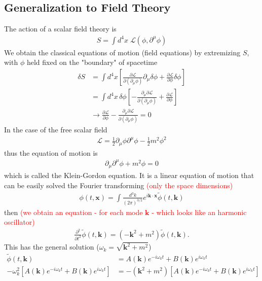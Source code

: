 \documentclass{article}
\begin{document}
\subsection{Generalization to Field Theory}
The action of a scalar field theory is
\begin{align}
S=\int d^4x\;\mathcal{L}(\phi,\partial^\mu\phi)
\end{align}
We obtain the classical equations of motion (field equations) by extremizing $S$, with $\phi$ held fixed on the "boundary" of spacetime
\begin{align}
\delta S
&=\int d^4x\left[\frac{\partial\mathcal{L}}{\partial(\partial_\mu\phi)}\partial_\mu\delta\phi+\frac{\partial\mathcal{L}}{\partial\phi}\delta\phi\right]\\
&=\int d^4x\,\delta\phi\left[-\frac{\partial_\mu\partial\mathcal{L}}{\partial(\partial_\mu\phi)}+\frac{\partial\mathcal{L}}{\partial\phi}\right]\\
&\rightarrow \frac{\partial\mathcal{L}}{\partial\phi}-\frac{\partial_\mu\partial\mathcal{L}}{\partial(\partial_\mu\phi)}=0
\end{align}
In the case of the free scalar field
\begin{align}
\mathcal{L}=\frac{1}{2}\partial_\mu\phi\partial^\mu\phi-\frac{1}{2}m^2\phi^2
\end{align}
thus the equation of motion is
\begin{align}
\partial_\mu\partial^\mu\phi+m^2\phi=0
\end{align}
which is called the Klein-Gordon equation. It is a linear equation of motion that can be easily solved the Fourier transforming \textcolor{red}{(only the space dimensions)}
\begin{align}
\phi(t,\mathbf{x})=\int \frac{d^3k}{(2\pi)^{3/2}}e^{i\mathbf{k}\cdot\mathbf{x}}\tilde{\phi}(t,\mathbf{k})
\end{align}
then \textcolor{red}{(we obtain an equation - for each mode $\mathbf{k}$ - which looks like an harmonic oscillator)}
\begin{align}
\frac{\partial^2}{\partial t^2}\tilde{\phi}(t,\mathbf{k})=(-\mathbf{k}^2+m^2)\tilde{\phi}(t,\mathbf{k}).
\end{align}
This has the general solution ($\omega_k=\sqrt{\mathbf{k}^2+m^2}$)
\begin{align}
\tilde{\phi}(t,\mathbf{k})
&=A(\mathbf{k})e^{-i\omega_k t}+B(\mathbf{k})e^{i\omega_k t}\\
-\omega_k^2[A(\mathbf{k})e^{-i\omega_kt}+B(\mathbf{k})e^{i\omega_kt}]&=-(\mathbf{k}^2+m^2)[A(\mathbf{k})e^{-i\omega_kt}+B(\mathbf{k})e^{i\omega_kt}]
\end{align}
\end{document}
